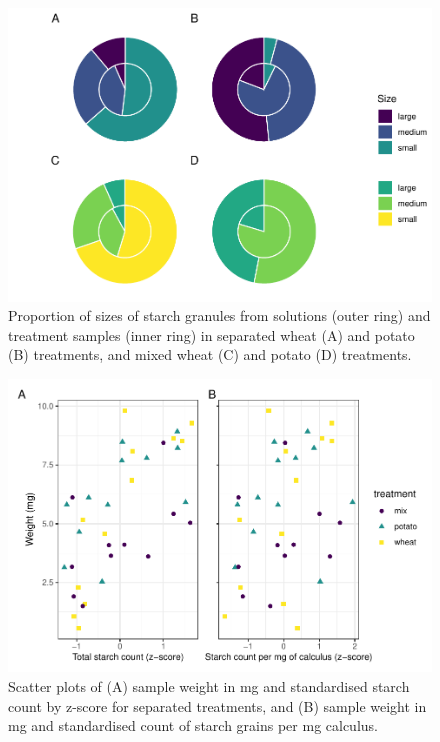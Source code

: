 \documentclass[utf8]{../templates/frontiersSCNS}
\begin{document}
\begin{figure}[H]

{\centering \includegraphics{../figures/ratio-plots-1} 

}

\caption{Proportion of sizes of starch granules from solutions (outer ring) and treatment samples (inner ring) in separated wheat (A) and potato (B) treatments, and mixed wheat (C) and potato (D) treatments.}\label{fig:ratio-plots}
\end{figure}

\begin{figure}[H]

{\centering \includegraphics{../figures/cor-plot-1} 

}

\caption{Scatter plots of (A) sample weight in mg and standardised starch count by z-score for separated treatments, and (B) sample weight in mg and standardised count of starch grains per mg calculus.}\label{fig:cor-plot}
\end{figure}



\end{document}
